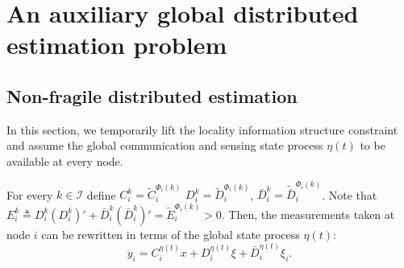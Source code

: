 \documentclass[a4paper,twocolumn]{autart}
\begin{document}
\section{An auxiliary global distributed estimation
  problem}\label{sec:design-global} 

\subsection{Non-fragile distributed estimation}  

In this section, we temporarily lift the locality information structure
constraint and assume the
global communication and sensing state process $\eta(t)$ to be available at
every node. 

For every $k\in\mathcal{I}$ define $C_i^k=\tilde C_i^{\Phi_i(k)}$
$D_i^k=\tilde D_i^{\Phi_i(k)}$, $ 
\bar D_i^k=\tilde {\bar D}_i^{\Phi_i(k)}$. Note that $E_i^k\triangleq D_i^k(
 D_i^k)'+\bar D_i^k(\bar D_i^k)'=\tilde E_i^{\Phi_i(k)}>0$.
Then, the measurements taken at node $i$ can be rewritten in terms of
the global state process $\eta(t)$:  
\begin{equation}\label{U6.yi.2}
y_i=C_i^{\eta(t)}x+D_i^{\eta(t)}\xi+\bar  D_i^{\eta(t)}\xi_i.
\end{equation}
\end{document}
